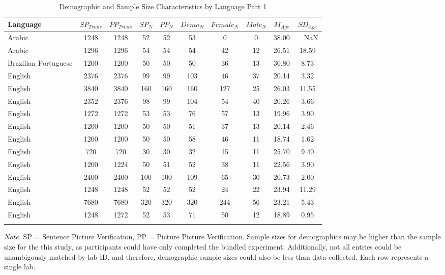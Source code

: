 \documentclass[
  man,floatsintext]{apa7}
\begin{document}
\begin{table}[tbp]

\begin{center}
\begin{threeparttable}

\caption{\label{tab:print-part1}Demographic and Sample Size Characteristics by Language Part 1}

\footnotesize{

\begin{tabular}{lccccccccc}
\toprule
Language & $SP_{Trials}$ & $PP_{Trials}$ & $SP_N$ & $PP_N$ & $Demo_N$ & $Female_N$ & $Male_N$ & $M_{Age}$ & $SD_{Age}$\\
\midrule
Arabic & 1248 & 1248 & 52 & 52 & 53 & 0 & 0 & 38.00 & \ \ NaN\\
Arabic & 1296 & 1296 & 54 & 54 & 54 & 42 & 12 & 26.51 & 18.59\\
Brazilian Portuguese & 1200 & 1200 & 50 & 50 & 50 & 36 & 13 & 30.80 & 8.73\\
English & 2376 & 2376 & 99 & 99 & 103 & 46 & 37 & 20.14 & 3.32\\
English & 3840 & 3840 & 160 & 160 & 160 & 127 & 25 & 26.03 & 11.55\\
English & 2352 & 2376 & 98 & 99 & 104 & 54 & 40 & 20.26 & 3.66\\
English & 1272 & 1272 & 53 & 53 & 76 & 57 & 13 & 19.96 & 3.90\\
English & 1200 & 1200 & 50 & 50 & 51 & 37 & 13 & 20.14 & 2.46\\
English & 1200 & 1200 & 50 & 50 & 58 & 46 & 11 & 18.74 & 1.62\\
English & 720 & 720 & 30 & 30 & 32 & 15 & 11 & 25.70 & 9.40\\
English & 1200 & 1224 & 50 & 51 & 52 & 38 & 11 & 22.56 & 3.90\\
English & 2400 & 2400 & 100 & 100 & 109 & 65 & 30 & 20.73 & 2.00\\
English & 1248 & 1248 & 52 & 52 & 52 & 24 & 22 & 23.94 & 11.29\\
English & 7680 & 7680 & 320 & 320 & 320 & 244 & 56 & 23.21 & 5.43\\
English & 1248 & 1272 & 52 & 53 & 71 & 50 & 12 & 18.89 & 0.95\\
\bottomrule
\addlinespace
\end{tabular}

}

\begin{tablenotes}[para]
\normalsize{\textit{Note.} SP = Sentence Picture Verification, PP = Picture Picture Verification. Sample sizes for demographics may be higher than the sample size for the this study, as participants could have only completed the bundled experiment. Additionally, not all entries could be unambigously matched by lab ID, and therefore, demographic sample sizes could also be less than data collected. Each row represents a single lab.}
\end{tablenotes}

\end{threeparttable}
\end{center}

\end{table}
\end{document}
